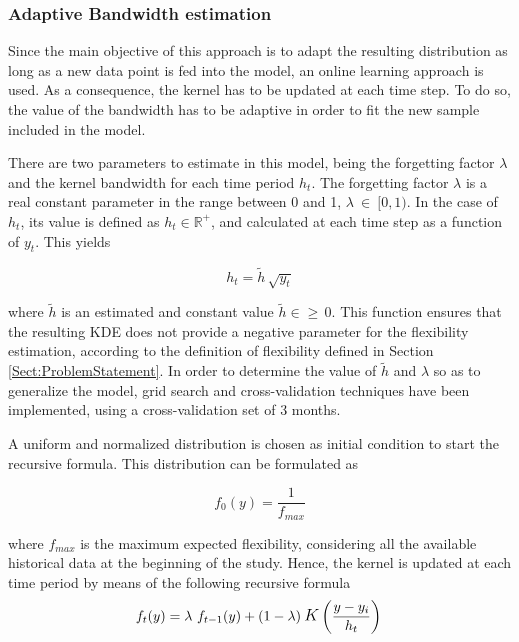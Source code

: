 \subsubsection{Adaptive Bandwidth estimation}
Since the main objective of this approach is to adapt the resulting distribution as long as a new data point is fed into the model, an online learning approach is used. As a consequence, the kernel has to be updated at each time step. To do so, the value of the bandwidth has to be adaptive in order to fit the new sample included in the model.

There are two parameters to estimate in this model, being the forgetting factor $\lambda$ and the kernel bandwidth for each time period $h_{t}$. The forgetting factor $\lambda$ is a real constant parameter in the range between 0 and 1, $\lambda\ \in\ [0,1)$. In the case of $h_{t}$, its value is defined as $h_{t} \in \mathbb{R}^+$, and calculated at each time step as a function of $y_{t}$. This yields 


\begin{equation} \label{eq:ht}
    h_{t} = \widetilde{h} \, \sqrt{y_{t}}
\end{equation}

where $\widetilde{h}$ is an estimated and constant value $\widetilde{h} \in \mathbb \geqslant \, 0$. This function ensures that the resulting KDE does not provide a negative parameter for the flexibility estimation, according to the definition of flexibility defined in Section \ref{Sect:ProblemStatement}. In order to determine the value of $\widetilde{h}$ and $\lambda$ so as to generalize the model, grid search and cross-validation techniques have been implemented, using a cross-validation set of 3 months.

A uniform and normalized distribution is chosen as initial condition to start the recursive formula. This distribution can be formulated as 

\begin{equation}
    f_{0}(y) = \frac{1}{f_{max}}
\end{equation}

where $f_{max}$ is the maximum expected flexibility, considering all the available historical data at the beginning of the study. Hence, the kernel is updated at each time period by means of the following recursive formula 
\begin{equation} \label{eq:recursive_formula}
    f_{t}(y) = \lambda\ f_{t-1}(y) + (1-\lambda) \: \mathlarger{K}\left(\frac{y - y_{i}}{h_{t}}\right) \\
\end{equation}

